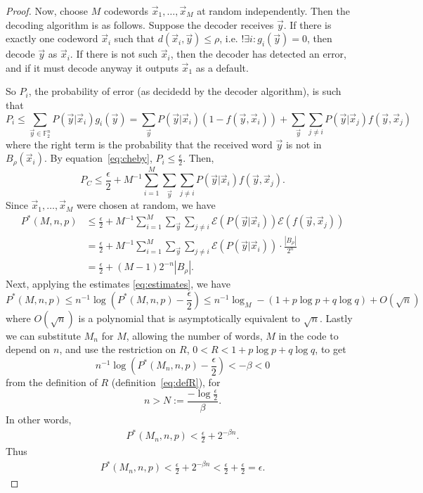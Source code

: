 \documentclass{article}
\newcommand{\F}{\mathbb{F}}
\newcommand{\E}{\mathcal{E}}
\renewcommand{\=}{\equiv}
\renewcommand{\i}{^{-1}}
\renewcommand{\v}{\vec}
\newcommand{\x}{{\v x}}
\newcommand{\y}{{\v y}}
\begin{document}
\begin{proof}
Now, choose $M$ codewords $\x_1, \dots, \x_M$ at random independently.
Then the decoding algorithm is as follows.
Suppose the decoder receives $\y$.
If there is exactly one codeword $\x_i$ such that $d(\x_i, \y) \leq \rho$, i.e. $!\exists i : g_i(\y) = 0$, then decode $\y$ as $\x_i$.
If there is not such $\x_i$, then the decoder has detected an error, and if it must decode anyway it outputs $\x_1$ as a default.

So $P_i$, the probability of error (as decidedd by the decoder algorithm), is such that
$$
  P_i
  \leq \sum_{\y \in \F_2^n} P(\y|\x_i) g_i(\y)
  = \sum_{\y} P(\y|\x_i)(1 - f(\y, \x_i)) + \sum_{\y} \sum_{j \neq i} P(\y|\x_j) f(\y, \x_j)
$$
where the right term is the probability that the received word $\y$ is not in $B_\rho(\x_i)$.
By equation~\ref{eq:cheby}, $P_i \leq \frac{\epsilon}{2}$.
Then,
$$ P_C \leq \frac{\epsilon}{2} + M\i \sum_{i = 1}^M \sum_{\y} \sum_{j \neq i} P(\y|\x_i) f(\y, \x_j). $$
Since $\x_1, \dots, \x_M$ were chosen at random, we have
\begin{align*}
  P^*(M, n, p)
  &\leq \frac{\epsilon}{2} + M\i \sum_{i = 1}^M \sum_{\y} \sum_{j \neq i} \E(P(\y|\x_i)) \E(f(\y, \x_j)) \\
  &= \frac{\epsilon}{2} + M\i \sum_{i = 1}^M \sum_{\y} \sum_{j \neq i} \E(P(\y|\x_i)) \cdot \frac{|B_\rho|}{2^n} \\
  &= \frac{\epsilon}{2} + (M - 1)2^{-n} |B_\rho|.
\end{align*}
Next, applying the estimates \ref{eq:estimates}, we have
$$ P^*(M, n, p) \leq n\i \log(P^*(M,n,p) - \frac{\epsilon}{2}) \leq n\i \log_M - (1 + p \log p + q \log q) + O(\sqrt{n}) $$
where $O(\sqrt{n})$ is a polynomial that is asymptotically equivalent to $\sqrt{n}$.
Lastly we can substitute $M_n$ for $M$, allowing the number of words, $M$ in the code to depend on $n$, and use the restriction on $R$, $0 < R < 1 + p \log p + q \log q$, to get
$$ n\i \log(P^*(M_n, n, p) - \frac{\epsilon}{2}) < - \beta < 0 $$
from the definition of $R$ (definition~\ref{eq:defR}), for $$n > N := \frac{-\log\frac{\epsilon}{2}}{\beta}.$$
In other words,
\begin{align*}
  P^*(M_n, n, p) < \frac{\epsilon}{2} + 2^{-\beta n}.
\end{align*}
Thus
\begin{align*}
  P^*(M_n, n, p)
  < \frac{\epsilon}{2} + 2^{-\beta n}
  < \frac{\epsilon}{2} + \frac{\epsilon}{2}
  = \epsilon.
\end{align*}
\end{proof}
\end{document}
